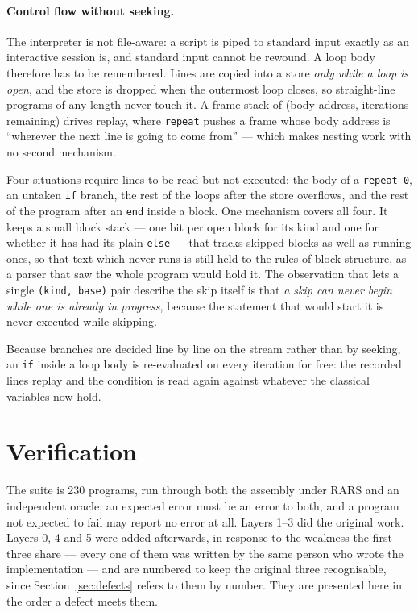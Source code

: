 \documentclass[11pt]{article}
\begin{document}
\paragraph{Control flow without seeking.} The interpreter is not file-aware: a script is
piped to standard input exactly as an interactive session is, and standard input cannot be
rewound. A loop body therefore has to be remembered. Lines are copied into a store
\emph{only while a loop is open}, and the store is dropped when the outermost loop closes,
so straight-line programs of any length never touch it. A frame stack of (body address,
iterations remaining) drives replay, where \texttt{repeat} pushes a frame whose body address
is ``wherever the next line is going to come from'' --- which makes nesting work with no
second mechanism.

Four situations require lines to be read but not executed: the body of a
\texttt{repeat 0}, an untaken \texttt{if} branch, the rest of the loops after the store
overflows, and the rest of the program after an \texttt{end} inside a block. One mechanism
covers all four. It keeps a small block stack --- one bit per open block for its kind and
one for whether it has had its plain \texttt{else} --- that tracks skipped blocks as well as
running ones, so that text which never runs is still held to the rules of block
structure, as a parser that saw the whole program would hold it. The observation that
lets a single \texttt{(kind, base)} pair describe the skip itself is that \emph{a skip can
never begin while one is already in progress}, because the statement that would start it
is never executed while skipping.

Because branches are decided line by line on the stream rather than by seeking, an
\texttt{if} inside a loop body is re-evaluated on every iteration for free: the recorded
lines replay and the condition is read again against whatever the classical variables now
hold.

\section{Verification}
\label{sec:verification}

The suite is 230 programs, run through both the assembly under RARS and an independent
oracle; an expected error must be an error to both, and a program not expected to fail may
report no error at all. Layers 1--3 did the original work. Layers 0, 4 and 5 were added
afterwards, in
response to the weakness the first three share --- every one of them was written by the
same person who wrote the implementation --- and are numbered to keep the original three
recognisable, since Section~\ref{sec:defects} refers to them by number. They are presented
here in the order a defect meets them.
\end{document}
